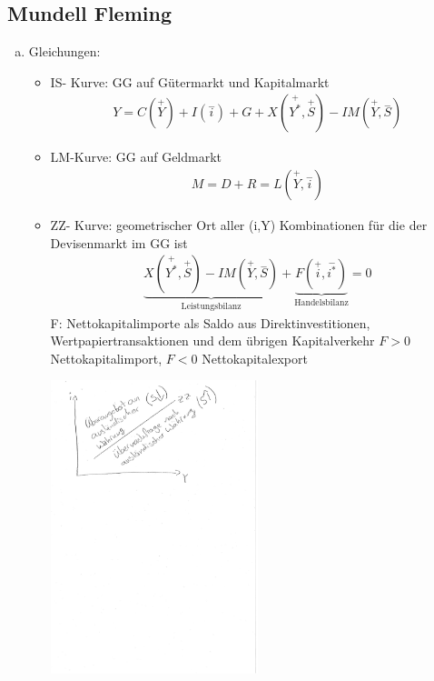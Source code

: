 \documentclass{scrartcl}
\begin{document}
\subsection{Mundell Fleming}
\begin{enumerate}[a)]
  \item Gleichungen:
  \begin{itemize}
    \item IS- Kurve: GG auf G\"{u}termarkt und Kapitalmarkt
    \begin{align*}
      Y = C(\overset{+}{Y}) + I(\overset{-}{i}) + G + X(\overset{+}{Y^*},\overset{+}{S}) - IM(\overset{+}{Y},\overset{-}{S})
    \end{align*}
    \item LM-Kurve: GG auf Geldmarkt
    \begin{align*}
      M= D+R = L(\overset{+}{Y},\overset{-}{i})
    \end{align*}
    \item ZZ- Kurve: geometrischer Ort aller (i,Y) Kombinationen f\"{u}r die der Devisenmarkt im GG ist
    \begin{align*}
       \underbrace{X(\overset{+}{Y^*},\overset{+}{S}) - IM(\overset{+}{Y},\overset{-}{S})}_\text{Leistungsbilanz} + \underbrace{F(\overset{+}{i},\overset{-}{i^*})}_\text{Handelsbilanz} = 0
    \end{align*}
    F: Nettokapitalimporte als Saldo aus Direktinvestitionen, Wertpapiertransaktionen und dem \"{u}brigen Kapitalverkehr
    $F>0$ Nettokapitalimport, $F<0$ Nettokapitalexport
\begin{center}
  \includegraphics[width=0.5\textwidth]{Bilder/ZZObenUnten.pdf}
\end{center}

\end{itemize}
\end{enumerate}
\end{document}
